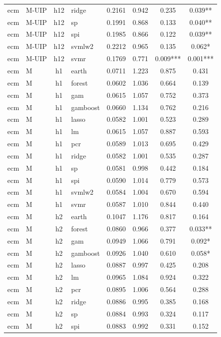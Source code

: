 \begin{ThreePartTable}
\begin{longtable}[t]{llclcccc}
ecm & M-UIP & h12 & ridge & 0.2161 & 0.942 & 0.235 & 0.039**\\
ecm & M-UIP & h12 & sp & 0.1991 & 0.868 & 0.133 & 0.040**\\
ecm & M-UIP & h12 & spi & 0.1985 & 0.866 & 0.122 & 0.039**\\
ecm & M-UIP & h12 & svmlw2 & 0.2212 & 0.965 & 0.135 & 0.062*\\
ecm & M-UIP & h12 & svmr & 0.1769 & 0.771 & 0.009*** & 0.001***\\
\addlinespace
ecm & M & h1 & earth & 0.0711 & 1.223 & 0.875 & 0.431\\
ecm & M & h1 & forest & 0.0602 & 1.036 & 0.664 & 0.139\\
ecm & M & h1 & gam & 0.0615 & 1.057 & 0.752 & 0.373\\
ecm & M & h1 & gamboost & 0.0660 & 1.134 & 0.762 & 0.216\\
ecm & M & h1 & lasso & 0.0582 & 1.001 & 0.523 & 0.289\\
ecm & M & h1 & lm & 0.0615 & 1.057 & 0.887 & 0.593\\
ecm & M & h1 & pcr & 0.0589 & 1.013 & 0.695 & 0.429\\
ecm & M & h1 & ridge & 0.0582 & 1.001 & 0.535 & 0.287\\
ecm & M & h1 & sp & 0.0581 & 0.998 & 0.442 & 0.184\\
ecm & M & h1 & spi & 0.0590 & 1.014 & 0.779 & 0.573\\
ecm & M & h1 & svmlw2 & 0.0584 & 1.004 & 0.670 & 0.594\\
ecm & M & h1 & svmr & 0.0587 & 1.010 & 0.844 & 0.440\\
\addlinespace
ecm & M & h2 & earth & 0.1047 & 1.176 & 0.817 & 0.164\\
ecm & M & h2 & forest & 0.0860 & 0.966 & 0.377 & 0.033**\\
ecm & M & h2 & gam & 0.0949 & 1.066 & 0.791 & 0.092*\\
ecm & M & h2 & gamboost & 0.0926 & 1.040 & 0.610 & 0.058*\\
ecm & M & h2 & lasso & 0.0887 & 0.997 & 0.425 & 0.208\\
ecm & M & h2 & lm & 0.0965 & 1.084 & 0.924 & 0.322\\
ecm & M & h2 & pcr & 0.0895 & 1.006 & 0.564 & 0.288\\
ecm & M & h2 & ridge & 0.0886 & 0.995 & 0.385 & 0.168\\
ecm & M & h2 & sp & 0.0884 & 0.993 & 0.324 & 0.117\\
ecm & M & h2 & spi & 0.0883 & 0.992 & 0.331 & 0.152\\

\end{longtable}
\end{ThreePartTable}
